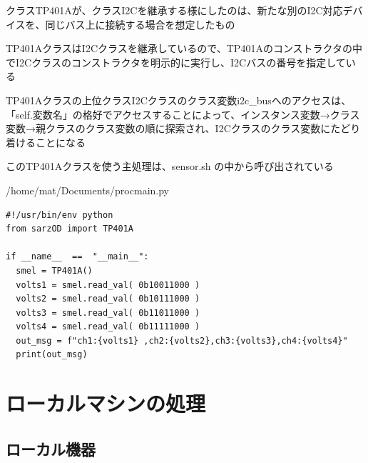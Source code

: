 \documentclass[12pt,a4paper,uplatex]{jsbook}
\begin{document}
\newpage

クラスTP401Aが、クラスI2Cを継承する様にしたのは、新たな別のI2C対応デバイスを、同じバス上に接続する場合を想定したもの

TP401AクラスはI2Cクラスを継承しているので、TP401Aのコンストラクタの中でI2Cクラスのコンストラクタを明示的に実行し、I2Cバスの番号を指定している

TP401Aクラスの上位クラスI2Cクラスのクラス変数i2c\_busへのアクセスは、「self.変数名」の格好でアクセスすることによって、インスタンス変数→クラス変数→親クラスのクラス変数の順に探索され、I2Cクラスのクラス変数にたどり着けることになる

このTP401Aクラスを使う主処理は、sensor.sh の中から呼び出されている

\begin{itembox}[l]{/home/mat/Documents/procmain.py}
	\begin{verbatim}
#!/usr/bin/env python
from sarzOD import TP401A

if __name__  ==  "__main__":
  smel = TP401A()
  volts1 = smel.read_val( 0b10011000 ) 
  volts2 = smel.read_val( 0b10111000 ) 
  volts3 = smel.read_val( 0b11011000 ) 
  volts4 = smel.read_val( 0b11111000 )
  out_msg = f"ch1:{volts1} ,ch2:{volts2},ch3:{volts3},ch4:{volts4}" 
  print(out_msg)
	\end{verbatim}
\end{itembox}

\section{ローカルマシンの処理}

\subsection{ローカル機器}
\end{document}
